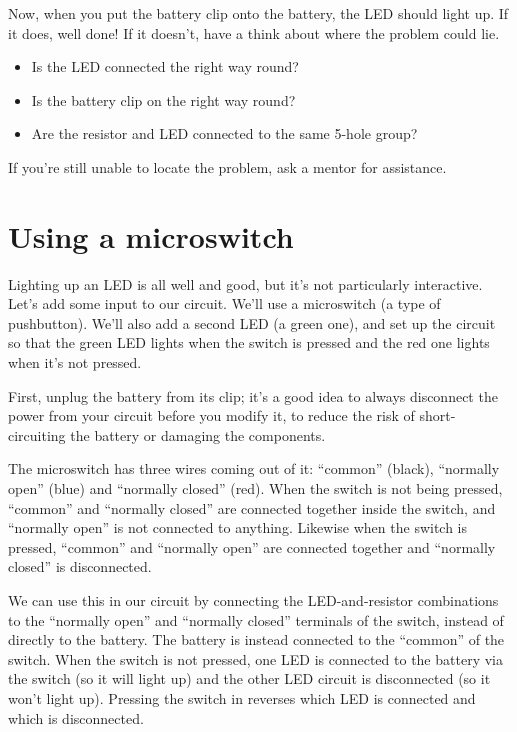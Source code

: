 \documentclass{article}
\begin{document}
Now, when you put the battery clip onto the battery, the LED should light up.
If it does, well done! If it doesn't, have a think about where the problem
could lie.

\begin{itemize}
\item Is the LED connected the right way round?
\item Is the battery clip on the right way round? 
\item Are the resistor and LED connected to the same 5-hole group?
\end{itemize}

If you're still unable to locate the problem, ask a mentor for assistance.

\section{Using a microswitch}

Lighting up an LED is all well and good, but it's not particularly interactive.
Let's add some input to our circuit. We'll use a microswitch (a type of
pushbutton). We'll also add a second LED (a green one), and set up the circuit
so that the green LED lights when the switch is pressed and the red one lights
when it's not pressed.

First, unplug the battery from its clip; it's a good idea to always disconnect
the power from your circuit before you modify it, to reduce the risk of
short-circuiting the battery or damaging the components.

The microswitch has three wires coming out of it: ``common'' (black), ``normally
open'' (blue) and ``normally closed'' (red). When the switch is not being
pressed, ``common'' and ``normally closed'' are connected together inside the
switch, and ``normally open'' is not connected to anything. Likewise when the
switch is pressed, ``common'' and ``normally open'' are connected together and
``normally closed'' is disconnected.

We can use this in our circuit by connecting the LED-and-resistor combinations
to the ``normally open'' and ``normally closed'' terminals of the switch,
instead of directly to the battery. The battery is instead connected to the
``common'' of the switch. When the switch is not pressed, one LED is connected
to the battery via the switch (so it will light up) and the other LED circuit is
disconnected (so it won't light up). Pressing the switch in reverses which LED
is connected and which is disconnected.
\end{document}
